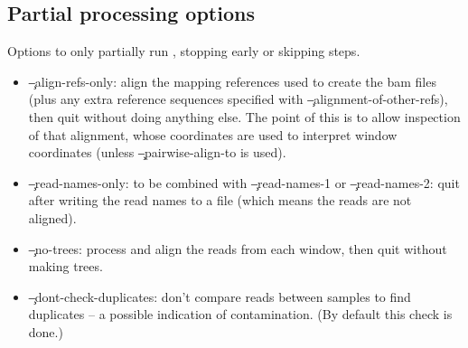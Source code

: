 \subsection{Partial processing options}
Options to only partially run \pmt, stopping early or skipping steps.
\begin{itemize}
 \item \c{--align-refs-only}: align the mapping references used to create the bam files (plus any extra reference sequences specified with \c{--alignment-of-other-refs}), then quit without doing anything
else.
The point of this is to allow inspection of that alignment, whose coordinates are used to interpret window coordinates (unless \c{--pairwise-align-to} is used).
\item \c{--read-names-only}: to be combined with \c{--read-names-1} or \c{--read-names-2}: quit after writing
the read names to a file (which means the reads are not aligned).
\item \c{--no-trees}: process and align the reads from each window, then quit without making trees.
\item \c{--dont-check-duplicates}: don't compare reads between samples to find duplicates -- a possible indication of contamination.
(By default this check is done.)
\end{itemize}


